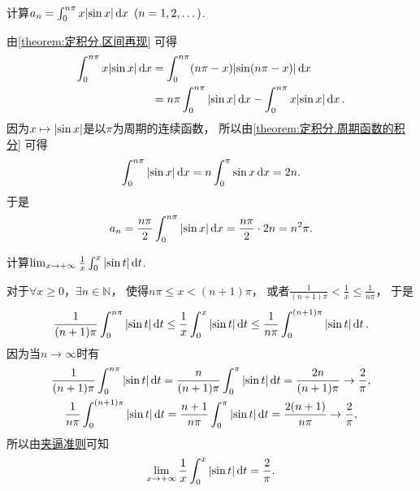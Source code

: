 \begin{example}
计算\(a_n = \int_0^{n\pi} x \abs{\sin x} \dd{x}\ (n=1,2,\dotsc)\).
\begin{solution}
由\cref{theorem:定积分.区间再现} 可得\begin{align*}
	\int_0^{n\pi} x \abs{\sin x} \dd{x}
	&= \int_0^{n\pi} (n\pi-x) \abs{\sin(n\pi-x)} \dd{x} \\
	&= n\pi \int_0^{n\pi} \abs{\sin x} \dd{x}
		- \int_0^{n\pi} x \abs{\sin x} \dd{x}.
\end{align*}
因为\(x \mapsto \abs{\sin x}\)是以\(\pi\)为周期的连续函数，
所以由\cref{theorem:定积分.周期函数的积分} 可得\[
	\int_0^{n\pi} \abs{\sin x} \dd{x}
	= n \int_0^\pi \sin x \dd{x}
	= 2n.
\]
于是\[
	a_n = \frac{n\pi}2 \int_0^{n\pi} \abs{\sin x} \dd{x}
	= \frac{n\pi}2 \cdot 2n
	= n^2\pi.
\]
\end{solution}
\end{example}
\begin{example}
计算\(\lim_{x\to+\infty} \frac1x \int_0^x \abs{\sin t} \dd{t}\).
\begin{solution}
对于\(\forall x\geq0\)，\(\exists n\in\mathbb{N}\)，
使得\(n\pi \leq x < (n+1)\pi\)，
或者\(\frac1{(n+1)\pi} < \frac1x \leq \frac1{n\pi}\)，
于是\[
	\frac1{(n+1)\pi} \int_0^{n\pi} \abs{\sin t} \dd{t}
	\leq \frac1x \int_0^x \abs{\sin t} \dd{t}
	\leq \frac1{n\pi} \int_0^{(n+1)\pi} \abs{\sin t} \dd{t}.
\]
因为当\(n\to\infty\)时有\begin{gather*}
	\frac1{(n+1)\pi} \int_0^{n\pi} \abs{\sin t} \dd{t}
	= \frac{n}{(n+1)\pi} \int_0^\pi \abs{\sin t} \dd{t}
	= \frac{2n}{(n+1)\pi}
	\to \frac2\pi, \\
	\frac1{n\pi} \int_0^{(n+1)\pi} \abs{\sin t} \dd{t}
	= \frac{n+1}{n\pi} \int_0^\pi \abs{\sin t} \dd{t}
	= \frac{2(n+1)}{n\pi}
	\to \frac2\pi,
\end{gather*}
所以由\hyperref[theorem:函数极限.夹逼准则]{夹逼准则}可知\[
	\lim_{x\to+\infty} \frac1x \int_0^x \abs{\sin t} \dd{t}
	= \frac2\pi.
\]
\end{solution}
\end{example}
